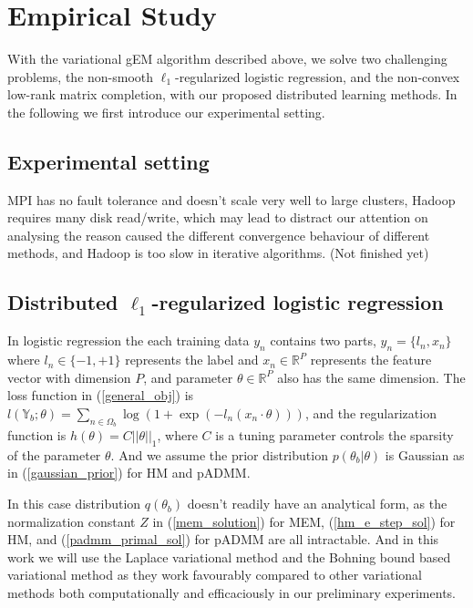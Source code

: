 \documentclass{article}
\newcommand{\1}[0]{\ensuremath{\boldsymbol{1}}\xspace}
\begin{document}
\section{Empirical Study}
With the variational gEM algorithm described above, we solve two challenging problems, the non-smooth $\ell_1$-regularized logistic regression, and the non-convex low-rank matrix completion, with our proposed distributed learning methods. In the following we first introduce our experimental setting.

\subsection{Experimental setting}

MPI has no fault tolerance and doesn't scale very well to large clusters, Hadoop requires many disk read/write, which may lead to distract our attention on analysing the reason caused the different convergence behaviour of different methods, and Hadoop is too slow in iterative algorithms. (Not finished yet)

\subsection{Distributed $\ell_1$-regularized logistic regression}
In logistic regression the each training data $y_n$ contains two parts, $y_n = \{l_n, x_n\}$ where $l_n \in \{-1, +1\}$ represents the label and $x_n \in \mathbb{R}^P$ represents the feature vector with dimension $P$, and parameter $\theta\in\mathbb{R}^P$ also has the same dimension. The loss function in (\ref{general_obj}) is $l(\mathbb{Y}_b; \theta) = \sum_{n\in\Omega_b}\log(1+\exp(-l_n(x_n\cdot\theta)))$, and the regularization function is $h(\theta) = C||\theta||_1$, where $C$ is a tuning parameter controls the sparsity of the parameter $\theta$. And we assume the prior distribution $p(\theta_b|\theta)$ is Gaussian as in (\ref{gaussian_prior}) for HM and pADMM. 

In this case distribution $q(\theta_b)$ doesn't readily have an analytical form, as the normalization constant $Z$ in (\ref{mem_solution}) for MEM, (\ref{hm_e_step_sol}) for HM, and (\ref{padmm_primal_sol}) for pADMM are all intractable. And in this work we will use the Laplace variational method \cite{Wang2013} and the Bohning bound based variational method \cite{Khan2010} as they work favourably compared to other variational methods both computationally and efficaciously in our preliminary experiments.
\end{document}

